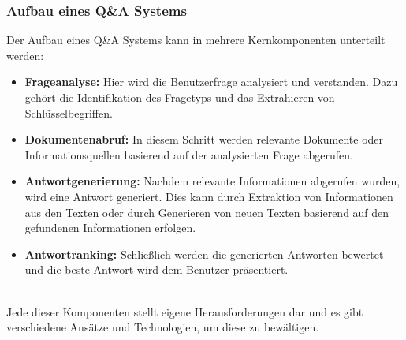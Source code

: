 \documentclass[12pt, a4paper]{article}
\begin{document}
\subsubsection*{Aufbau eines Q\&A Systems}
Der Aufbau eines Q\&A Systems kann in mehrere Kernkomponenten unterteilt werden:
\begin{itemize}
	\item \textbf{Frageanalyse:} Hier wird die Benutzerfrage analysiert und verstanden. Dazu gehört die Identifikation des Fragetyps und das Extrahieren von Schlüsselbegriffen.
	\item \textbf{Dokumentenabruf:} In diesem Schritt werden relevante Dokumente oder Informationsquellen basierend auf der analysierten Frage abgerufen.
	\item \textbf{Antwortgenerierung:} Nachdem relevante Informationen abgerufen wurden, wird eine Antwort generiert. Dies kann durch Extraktion von Informationen aus den Texten oder durch Generieren von neuen Texten basierend auf den gefundenen Informationen erfolgen.
	\item \textbf{Antwortranking:} Schließlich werden die generierten Antworten bewertet und die beste Antwort wird dem Benutzer präsentiert.
\end{itemize}
\ \\
Jede dieser Komponenten stellt eigene Herausforderungen dar und es gibt verschiedene Ansätze und Technologien, um diese zu bewältigen.   \\  \\
\end{document}
